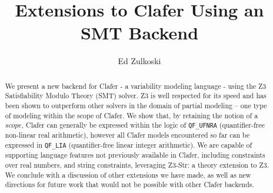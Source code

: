 \documentclass{easychair}
\begin{document}
%
\title{Extensions to Clafer Using an SMT Backend}



%
\author{
Ed Zulkoski\\
}




\clearpage

\maketitle

\begin{abstract}
We present a new backend for Clafer - a variability modeling language - using the Z3 Satisfiability Modulo Theory (SMT) solver. Z3 is well respected for its speed and has been shown to outperform other solvers in the domain of partial modeling -- one type of modeling within the scope of Clafer. We show that, by retaining the notion of a $scope$, Clafer can generally be expressed within the logic of \texttt{QF\_UFNRA} (quantifier-free non-linear real arithmetic), however all Clafer models encountered so far can be expressed in \texttt{QF\_LIA} (quantifier-free linear integer arithmetic). We are capable of supporting language features not previously available in Clafer, including constraints over real numbers, and string constraints, leveraging Z3-Str: a theory extension to Z3. We conclude with a discussion of other extensions we have made, as well as new directions for future work that would not be possible with other Clafer backends.
\end{abstract}
\end{document}
